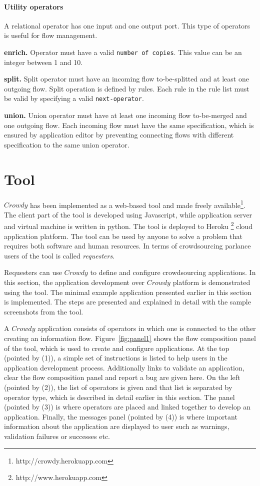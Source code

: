 \subsubsection{Utility operators}
A relational operator has one input and one output port. This type of operators is useful for 
flow management.

\textbf{enrich.}
Operator must have a valid \texttt{number of copies}. This value can be an integer between 
1 and 10.

\textbf{split.}
Split operator must have an incoming flow to-be-splitted and at least one outgoing flow. 
Split operation is defined by rules. Each rule in the rule list must be valid by specifying 
a valid \texttt{next-operator}.

\textbf{union.}
Union operator must have at least one incoming flow to-be-merged and one outgoing flow. 
Each incoming flow must have the same specification, which is ensured by application editor 
by preventing connecting flows with different specification to the same union operator.



\chapter{Tool}
\label{sec:tool}
$Crowdy$ has been implemented as a web-based tool and made freely 
available\footnote{http://crowdy.herokuapp.com}. The 
client part of the tool is developed using Javascript, while application server and 
virtual machine is written in python. The tool is deployed to Heroku 
\footnote{http://www.herokuapp.com} cloud application 
platform. The tool can be used by anyone to solve a problem that requires both 
software and human resources. In terms of crowdsourcing parlance users of the tool 
is called \textit{requesters}.

Requesters can use $Crowdy$ to define and configure crowdsourcing applications. 
In this section, the application development over $Crowdy$ platform is 
demonstrated using the tool. The minimal example application presented earlier 
in this section is implemented. The steps are presented and explained in detail 
with the sample screenshots from the tool.

A $Crowdy$ application consists of operators in which one is connected to the other creating 
an information flow. Figure~\ref{fig:panel1} shows the flow composition panel of the tool, which 
is used to create and configure applications. At the top (pointed by (1)), a simple set of 
instructions is listed to help users in the application development process. Additionally links 
to validate an application, clear the flow composition panel and report a bug are given here. 
On the left (pointed by (2)), the list of operators is given and that list is separated by operator 
type, which is described in detail earlier in this section. The panel (pointed by (3)) is where 
operators are placed and linked together to develop an application. Finally, the messages 
panel (pointed by (4)) is where important information about the application are displayed to 
user such as warnings, validation failures or successes etc.

